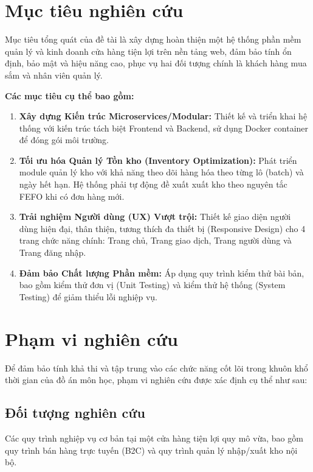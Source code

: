 \section{Mục tiêu nghiên cứu}

Mục tiêu tổng quát của đề tài là xây dựng hoàn thiện một hệ thống phần mềm quản lý và kinh doanh cửa hàng tiện lợi trên nền tảng web, đảm bảo tính ổn định, bảo mật và hiệu năng cao, phục vụ hai đối tượng chính là khách hàng mua sắm và nhân viên quản lý.

\textbf{Các mục tiêu cụ thể bao gồm:}
\begin{enumerate}
    \item \textbf{Xây dựng Kiến trúc Microservices/Modular:} Thiết kế và triển khai hệ thống với kiến trúc tách biệt Frontend và Backend, sử dụng Docker container để đóng gói môi trường.
    \item \textbf{Tối ưu hóa Quản lý Tồn kho (Inventory Optimization):} Phát triển module quản lý kho với khả năng theo dõi hàng hóa theo từng lô (batch) và ngày hết hạn. Hệ thống phải tự động đề xuất xuất kho theo nguyên tắc FEFO khi có đơn hàng mới.
    \item \textbf{Trải nghiệm Người dùng (UX) Vượt trội:} Thiết kế giao diện người dùng hiện đại, thân thiện, tương thích đa thiết bị (Responsive Design) cho 4 trang chức năng chính: Trang chủ, Trang giao dịch, Trang người dùng và Trang đăng nhập.
    \item \textbf{Đảm bảo Chất lượng Phần mềm:} Áp dụng quy trình kiểm thử bài bản, bao gồm kiểm thử đơn vị (Unit Testing) và kiểm thử hệ thống (System Testing) để giảm thiểu lỗi nghiệp vụ.
\end{enumerate}

\section{Phạm vi nghiên cứu}

Để đảm bảo tính khả thi và tập trung vào các chức năng cốt lõi trong khuôn khổ thời gian của đồ án môn học, phạm vi nghiên cứu được xác định cụ thể như sau:

\subsection{Đối tượng nghiên cứu}
Các quy trình nghiệp vụ cơ bản tại một cửa hàng tiện lợi quy mô vừa, bao gồm quy trình bán hàng trực tuyến (B2C) và quy trình quản lý nhập/xuất kho nội bộ.

